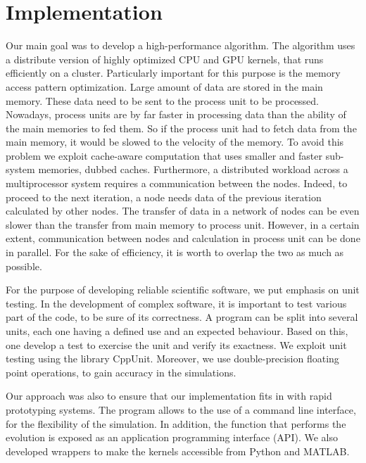 \chapter{Implementation}

Our main goal was to develop a high-performance algorithm. The algorithm uses a distribute version of highly optimized CPU and GPU kernels, that runs efficiently on a cluster. Particularly important for this purpose is the memory access pattern optimization. Large amount of data are stored in the main memory. These data need to be sent to the process unit to be processed. Nowadays, process units are by far faster in processing data than the ability of the main memories to fed them. So if the process unit had to fetch data from the main memory, it would be slowed to the velocity of the memory. To avoid this problem we exploit cache-aware computation that uses smaller and faster sub-system memories, dubbed caches. 
Furthermore, a distributed workload across a multiprocessor system requires a communication between the nodes. Indeed, to proceed to the next iteration, a node needs data of the previous iteration calculated by other nodes. The transfer of data in a network of nodes can be even slower than the transfer from main memory to process unit. However, in a certain extent, communication between nodes and calculation in process unit can be done in parallel. For the sake of efficiency, it is worth to overlap the two as much as possible.

For the purpose of developing reliable scientific software, we put emphasis on unit testing. In the development of complex software, it is important to test various part of the code, to be sure of its correctness. A program can be split into several units, each one having a defined use and an expected behaviour. Based on this, one develop a test to exercise the unit and verify its exactness. We exploit unit testing using the library CppUnit. Moreover, we use double-precision floating point operations, to gain accuracy in the simulations.

Our approach was also to ensure that our implementation fits in with rapid prototyping
systems. The program allows to the use of a command line interface, for the flexibility of the simulation. In addition, the function that performs the evolution is exposed as an application programming interface (API). We also developed wrappers to make the kernels accessible from Python and MATLAB.

